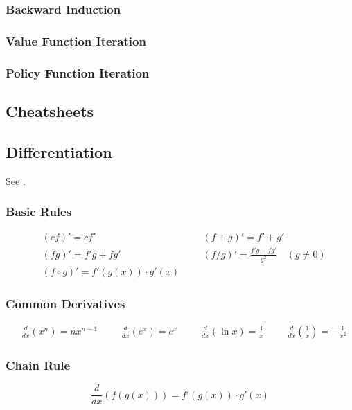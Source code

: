 \documentclass[11pt,a4paper]{book}
\theoremstyle{definition}\newtheorem{definition}{Definition}
\theoremstyle{definition}\newtheorem{fact}{Fact}
\theoremstyle{definition}\newtheorem{remark}{Remark}
\theoremstyle{definition}\newtheorem{ex}{Ex.}
\theoremstyle{definition}\newtheorem{project}{Project}
\theoremstyle{definition}\newtheorem{problem}{Problem}
\theoremstyle{definition}\newtheorem{example}{Example}
\numberwithin{theorem}{section}
\numberwithin{corollary}{chapter}
\numberwithin{assumption}{chapter}
\numberwithin{definition}{chapter}
\numberwithin{prop}{chapter}
\numberwithin{notation}{chapter}
\numberwithin{problem}{chapter}
\numberwithin{example}{chapter}
\numberwithin{fact}{chapter}
\numberwithin{ex}{chapter}
\begin{document}
	\subsection{Backward Induction}
	\subsection{Value Function Iteration}
	\subsection{Policy Function Iteration}
	
		

	
	
	
	
	\begin{appendices}
	
	\chapter{Cheatsheets}
		\section{Differentiation}
	See \citet[Ch. 5]{springcamp}.
	\subsection*{Basic Rules}
	\begin{align*}
		&(cf)' = cf' &&
		&(f+g)' = f' + g' \\
		&(fg)' = f'g + fg' &&
		&(f/g)' = \frac{f'g - fg'}{g^2} \quad (g \neq 0) \\
		&(f \circ g)' = f'(g(x)) \cdot g'(x)
	\end{align*}
	
	\subsection*{Common Derivatives}
	\begin{align*}
		&\frac{d}{dx} (x^n) = nx^{n-1} &&
		&\frac{d}{dx} (e^x) = e^x &&
		&\frac{d}{dx} (\ln x) = \frac{1}{x} &&
		&\frac{d}{dx} \left(\frac{1}{x}\right) = -\frac{1}{x^2}
	\end{align*}
	
	\subsection*{Chain Rule}
	\[
	\frac{d}{dx} (f(g(x))) = f'(g(x)) \cdot g'(x)
	\]
	

\end{appendices}
\end{document}
